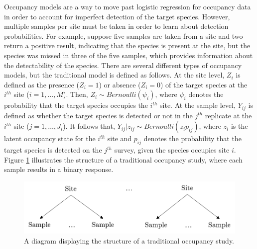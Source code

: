 \documentclass[12pt]{article}\usepackage[]{graphicx}\usepackage[]{color}
\begin{document}
Occupancy models are a way to move past logistic regression for occupancy data in order to account for imperfect detection of the target species. However, multiple samples per site must be taken in order to learn about detection probabilities. For example, suppose five samples are taken from a site and two return a positive result, indicating that the species is present at the site, but the species was missed in three of the five samples, which provides information about the detectability of the species. There are several different types of occupancy models, but the traditional model is defined as follows. At the site level, $Z_i$ is defined as the presence ($Z_i = 1$) or absence ($Z_i = 0$) of the target species at the $i^{th}$ site ($i = 1, \dots, M$). Then, $Z_i \sim Bernoulli(\psi_i)$, where $\psi_i$ denotes the probability that the target species occupies the $i^{th}$ site. At the sample level, $Y_{ij}$ is defined as whether the target species is detected or not in the $j^{th}$ replicate at the $i^{th}$ site ($j = 1, \dots, J_{i}$). It follows that, $Y_{ij}|z_{ij} \sim Bernoulli(z_{i}p_{ij})$, where $z_i$ is the latent occupancy state for the $i^{th}$ site and $p_{ij}$ denotes the probability that the target species is detected on the $j^{th}$ survey, given the species occupies site $i$. Figure \ref{fig:ssocc} illustrates the structure of a traditional occupancy study, where each sample results in a binary response. 

\begin{figure}[]
	\centering
	\includegraphics[scale = 0.7]{images/ssocc}
	\caption{A diagram displaying the structure of a traditional occupancy study.}
	\label{fig:ssocc}
\end{figure}
\end{document}
